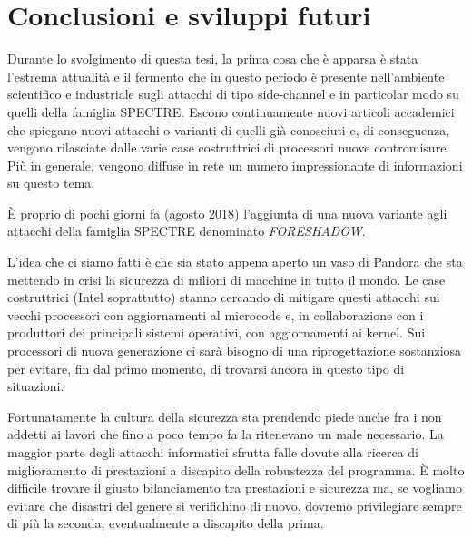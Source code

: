 \chapter{Conclusioni e sviluppi futuri}
	Durante lo svolgimento di questa tesi, la prima cosa che è apparsa è stata l'estrema attualità e il fermento che in questo periodo è presente nell'ambiente scientifico e industriale sugli attacchi di tipo side-channel e in particolar modo su quelli della famiglia SPECTRE. Escono continuamente nuovi articoli accademici che spiegano nuovi attacchi o varianti di quelli già conosciuti e, di conseguenza, vengono rilasciate dalle varie case costruttrici di processori nuove contromisure. Più in generale, vengono diffuse in rete un numero impressionante di informazioni su questo tema.
	
	\`{E} proprio di pochi giorni fa (agosto 2018) l'aggiunta di una nuova variante agli attacchi della famiglia SPECTRE denominato \emph{FORESHADOW}\cite{bulck2018foreshadow}.
	
	L'idea che ci siamo fatti è che sia stato appena aperto un vaso di Pandora che sta mettendo in crisi la sicurezza di milioni di macchine in tutto il mondo. Le case costruttrici (Intel soprattutto) stanno cercando di mitigare questi attacchi sui vecchi processori con aggiornamenti al microcode e, in collaborazione con i produttori dei principali sistemi operativi, con aggiornamenti ai kernel. Sui processori di nuova generazione ci sarà bisogno di una riprogettazione sostanziosa per evitare, fin dal primo momento, di trovarsi ancora in questo tipo di situazioni. 
	
	Fortunatamente la cultura della sicurezza sta prendendo piede anche fra i non addetti ai lavori che fino a poco tempo fa la ritenevano un male necessario. La maggior parte degli attacchi informatici sfrutta falle dovute alla ricerca di miglioramento di prestazioni a discapito della robustezza del programma. \`{E} molto difficile trovare il giusto bilanciamento tra prestazioni e sicurezza ma, se vogliamo evitare che disastri del genere si verifichino di nuovo, dovremo privilegiare sempre di più la seconda, eventualmente a discapito della prima.
	
	